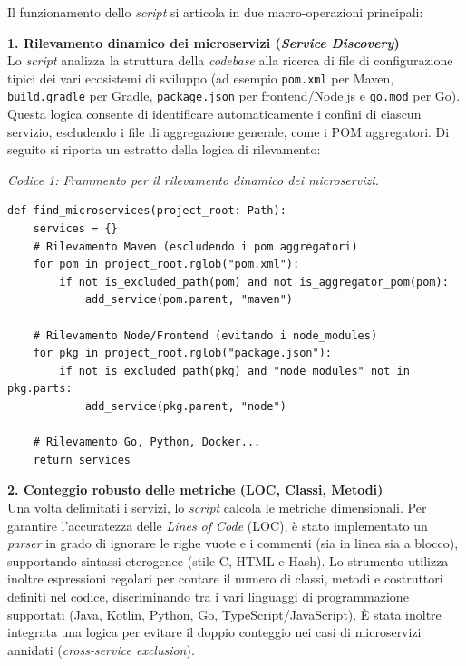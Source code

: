 Il funzionamento dello \textit{script} si articola in due macro-operazioni principali:

\vspace{0.5em}
\noindent\textbf{1. Rilevamento dinamico dei microservizi (\textit{Service Discovery})}\\
Lo \textit{script} analizza la struttura della \textit{codebase} alla ricerca di file di configurazione tipici dei vari ecosistemi di sviluppo (ad esempio \texttt{pom.xml} per Maven, \texttt{build.gradle} per Gradle, \texttt{package.json} per frontend/Node.js e \texttt{go.mod} per Go). Questa logica consente di identificare automaticamente i confini di ciascun servizio, escludendo i file di aggregazione generale, come i POM aggregatori.
Di seguito si riporta un estratto della logica di rilevamento:

\vspace{0.5em}
\noindent\textit{Codice 1: Frammento per il rilevamento dinamico dei microservizi.}
\begin{Verbatim}[breaklines=true, breakanywhere=true]
def find_microservices(project_root: Path):
    services = {}
    # Rilevamento Maven (escludendo i pom aggregatori)
    for pom in project_root.rglob("pom.xml"):
        if not is_excluded_path(pom) and not is_aggregator_pom(pom):
            add_service(pom.parent, "maven")
            
    # Rilevamento Node/Frontend (evitando i node_modules)
    for pkg in project_root.rglob("package.json"):
        if not is_excluded_path(pkg) and "node_modules" not in pkg.parts:
            add_service(pkg.parent, "node")
            
    # Rilevamento Go, Python, Docker...
    return services
\end{Verbatim}
\vspace{0.5em}

\noindent\textbf{2. Conteggio robusto delle metriche (LOC, Classi, Metodi)}\\
Una volta delimitati i servizi, lo \textit{script} calcola le metriche dimensionali. Per garantire l'accuratezza delle \textit{Lines of Code} (LOC), è stato implementato un \textit{parser} in grado di ignorare le righe vuote e i commenti (sia in linea sia a blocco), supportando sintassi eterogenee (stile C, HTML e Hash). Lo strumento utilizza inoltre espressioni regolari per contare il numero di classi, metodi e costruttori definiti nel codice, discriminando tra i vari linguaggi di programmazione supportati (Java, Kotlin, Python, Go, TypeScript/JavaScript). È stata inoltre integrata una logica per evitare il doppio conteggio nei casi di microservizi annidati (\textit{cross-service exclusion}).


